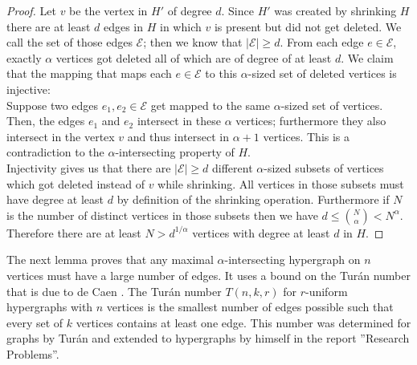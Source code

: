 \documentclass[11pt,letterpaper]{article}
\def\C{\mathcal{E}}
\begin{document}
\begin{proof}
Let $v$ be the vertex in $H'$ of degree $d$. Since $H'$ was created by shrinking $H$ there are at least $d$ edges in $H$ in which $v$ is present but did not get deleted. We call the set of those edges $\C$; then we know that $|\C|\geq d$. From each edge $e \in \C$, exactly $\alpha$ vertices got deleted all of which are of degree of at least $d$. We claim that the mapping that maps each $e \in \C$ to this $\alpha$-sized set of deleted vertices is injective:\\
 
Suppose two edges $e_1, e_2\in \C$ get mapped to the same $\alpha$-sized set of vertices. Then, the edges $e_1$ and $e_2$ intersect in these $\alpha$ vertices; furthermore they also intersect in the vertex $v$ and thus intersect in $\alpha+1$ vertices. This is a contradiction to the $\alpha$-intersecting property of $H$.\\

Injectivity gives us that there are $|\C| \geq d$ different $\alpha$-sized subsets of vertices which got deleted instead of $v$ while shrinking. All vertices in those subsets must have degree at least $d$ by definition of the shrinking operation. Furthermore if $N$ is the number of distinct vertices in those subsets then we have $d \leq \binom{N}{\alpha} < N^{\alpha}$. Therefore there are at least $N > d^{1/\alpha}$ vertices with degree at least $d$ in $H$. 
\end{proof}

\medskip

The next lemma proves that any maximal $\alpha$-intersecting hypergraph on $n$ vertices must have a large number of edges. It uses a bound on the Tur{\'a}n number that is due to de Caen \cite{de1983extension}. The Tur{\'a}n number $T(n,k,r)$ for $r$-uniform hypergraphs with $n$ vertices is the smallest number of edges possible such that every set of $k$ vertices contains at least one edge. This number was determined for graphs by Tur{\'a}n \cite{turan1941extremal} and extended to hypergraphs by himself in the report ''Research Problems''\cite{turan1961research}.\\
\end{document}
